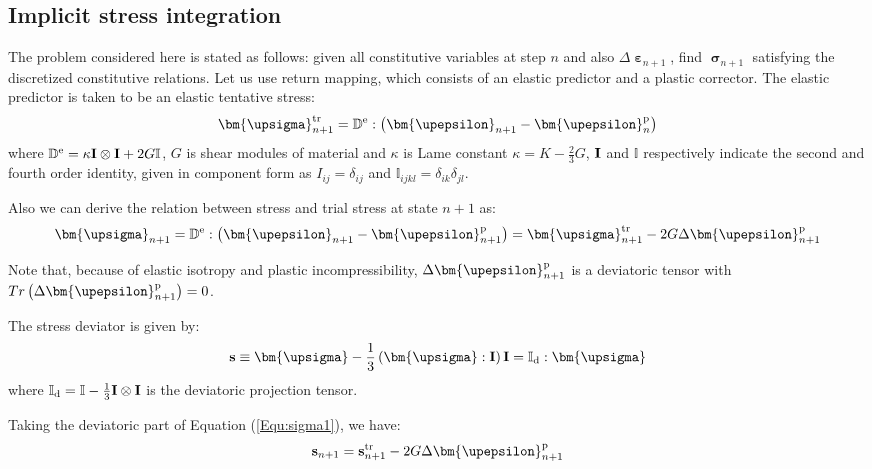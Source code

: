 \subsection{Implicit stress integration}
\noindent
The problem considered here is stated as follows: given all constitutive variables at step $n$ and also $\Delta {{\bm{\upepsilon }}_{n + 1}}$, find $\bm{\upsigma}_{n+1}$  satisfying the discretized constitutive relations. Let us use return mapping, which consists of an elastic predictor and a plastic corrector. The elastic predictor is taken to be an elastic tentative stress:
\begin{equation}
{\bm{\upsigma }}_{n + 1}^{\rm{tr}} = {\mathbb{D}^{\rm{e}}}:\left( {{{\bm{\upepsilon }}_{n + 1}} - {\bm{\upepsilon }}_n^{\rm{p}}} \right)
\end{equation}
where ${\mathbb{D}^{\rm{e}}} = \kappa {\bf{I}} \otimes {\bf{I}} + 2G\mathbb{I}$, $G$ is shear modules of material and $\kappa$ is Lame constant $\kappa  = K - \frac{2}{3}G$, ${\bf{I}}$ and $\mathbb{I}$ respectively indicate the second and fourth order identity, given in component form as ${I_{ij}} = {\delta _{ij}}$ and ${\mathbb{I}_{ijkl}} = {\delta _{ik}}{\delta _{jl}}$.

Also we can derive the relation between stress and trial stress at state $n+1$ as:
\begin{equation}
\label{Equ:sigma1}
{{\bm{\upsigma }}_{n + 1}^{} = {\mathbb{D}^{\rm{e}}}:\left( {{\bm{\upepsilon }}_{n + 1}^{} - {\bm{\upepsilon }}_{n + 1}^{\rm{p}}} \right)} = {\bm{\upsigma }}_{n + 1}^{\rm{tr}} - 2G\Delta {\bm{\upepsilon }}_{n + 1}^{\rm{p}}
\end{equation}

Note that, because of elastic isotropy and plastic incompressibility, $\Delta {\bm{\upepsilon }}_{n + 1}^{\rm{p}}$ is a deviatoric tensor with $Tr\left( {\Delta {\bm{\upepsilon }}_{n + 1}^{\rm{p}}} \right)=0$.

The stress deviator is given by:
\begin{equation}
{\bf{s}} \equiv {\bm{\upsigma }} - \frac{1}{3}\left( {{\bm{\upsigma }}:{\bf{I}}} \right){\bf{I}} = {\mathbb{I}_{\rm{d}}}:{\bm{\upsigma }}
\end{equation}
where ${\mathbb{I}_{\rm{d}}} = \mathbb{I} - \frac{1}{3}{\bf{I}} \otimes {\bf{I}}$ is the deviatoric projection tensor.

Taking the deviatoric part of Equation (\ref{Equ:sigma1}), we have:
\begin{equation}
{{\bf{s}}_{n + 1}} = {\bf{s}}_{n + 1}^{\rm{tr}} - 2G\Delta {\bm{\upepsilon }}_{n + 1}^{\rm{p}}
\end{equation}

